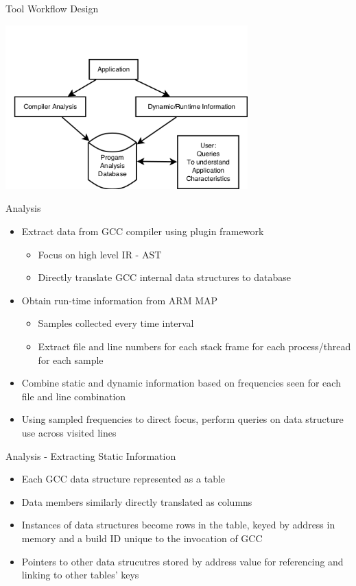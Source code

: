 \documentclass[final]{beamer}
\let\olditem\item
\renewcommand{\item}{\vspace{\fill}\olditem}
\begin{document}
\begin{frame}{\hspace{0.02\paperwidth}Tool Workflow Design}
\begin{center}
\includegraphics[width=0.7\textwidth]{images/design.png}
\end{center}
\end{frame}

\begin{frame}{\hspace{0.02\paperwidth}Analysis}
\begin{itemize}
\item Extract data from \acs{GCC} compiler using plugin framework
\begin{itemize}
\item Focus on high level \acs{IR} - \acs{AST}
\item Directly translate \acs{GCC} internal data structures to database
\end{itemize}
\item Obtain run-time information from ARM MAP
\begin{itemize}
\item Samples collected every time interval
\item Extract file and line numbers for each stack frame for each process/thread for each sample
\end{itemize}
\item Combine static and dynamic information based on frequencies seen for each file and line combination
\item Using sampled frequencies to direct focus, perform queries on data structure use across visited lines
\end{itemize}
\end{frame}

\begin{frame}{\hspace{0.02\paperwidth}Analysis - Extracting Static Information}
\begin{itemize}
\item Each \acs{GCC} data structure represented as a table
\item Data members similarly directly translated as columns
\item Instances of data structures become rows in the table, keyed by address in memory and a build ID unique to the invocation of \acs{GCC}
\item Pointers to other data strucutres stored by address value for referencing and linking to other tables' keys
\end{itemize}
\end{frame}
\end{document}
